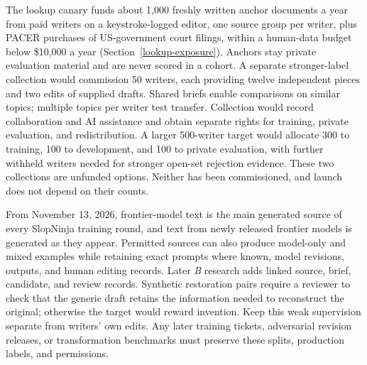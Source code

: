 The lookup canary funds about 1,000 freshly written anchor documents a year
from paid writers on a keystroke-logged editor, one source group per writer,
plus PACER purchases of US-government court filings, within a human-data budget
below \$10,000 a year (Section~\ref{lookup-exposure}). Anchors stay private
evaluation material and are never scored in a cohort. A separate
stronger-label collection would commission 50 writers, each providing twelve independent
pieces and two edits of supplied drafts. Shared
briefs enable comparisons on similar topics; multiple topics per writer test
transfer. Collection would record collaboration and AI assistance and obtain
separate rights for training, private evaluation, and redistribution. A larger
500-writer target would allocate 300 to training, 100 to development, and 100 to
private evaluation, with further withheld writers needed for stronger open-set
rejection evidence. These two collections are unfunded options. Neither has
been commissioned, and launch does not depend on their counts.

From November 13, 2026, frontier-model text is the main generated source of
every SlopNinja training round, and text from newly released frontier models is
generated as they appear.
Permitted sources can also produce model-only and mixed examples while
retaining exact prompts where known, model revisions, outputs, and human editing
records. Later \textit{B} research adds linked source, brief, candidate, and
review records. Synthetic restoration pairs require a reviewer to check that
the generic draft retains the information needed to reconstruct the original;
otherwise the target would reward invention. Keep this weak supervision
separate from writers' own edits. Any later training tickets, adversarial
revision releases, or transformation benchmarks must preserve these splits,
production labels, and permissions.
